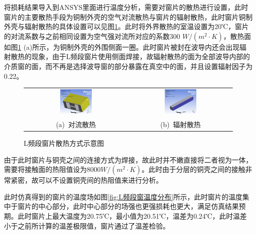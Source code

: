 \documentclass[master]{thesis-uestc}
\begin{document}
将损耗结果导入到ANSYS里面进行温度分析，需要对窗片的散热进行设置，此时窗片的主要散热手段为铜制外壳的空气对流散热与窗片的辐射散热，此时窗片铜制外壳与辐射散热的具体设置可以见图\ref{fig:L频段窗片散热示意}。此时将外界散热的室温设置为20℃，窗片的对流系数与之前相同设置为空气强对流所对应的系数300 \(W/(m^2 \cdot K)\)，散热面如图\ref{fig:L频段窗片散热示意} (a)所示，为铜制外壳的外围侧面一圈。此时窗片被封在波导内还会出现辐射散热的现象，由于L频段窗片使用侧面焊接，故辐射散热的面为全部波导内部的介质窗的面，而不再是选择波导窗的部分暴露在真空中的面，并且设置辐射因子为0.22。
\begin{figure}[!htb]
    \small
    \centering
    \begin{tabular}{@{\ }c@{\ }c}
        \includegraphics[width=0.32\textwidth]{pic/chapter4/L对流散热.png} & 
        \hspace{5pt}
        \includegraphics[width=0.32\textwidth]{pic/chapter4/L辐射散热.png}     \\
        \mbox{\small (a) 对流散热}                                                                               & 
        \mbox{\small (b) 辐射散热}                                                                                  \\
    \end{tabular}
    \caption{L频段窗片散热方式示意图}
    \label{fig:L频段窗片散热示意}
\end{figure}

由于此时窗片与铜壳之间的连接方式为焊接，故此时并不嫩直接将二者视为一体，需要将接触面的热阻值设为8000\(W / (m^2 \cdot K)\)。此时由于分层的铜壳之间的接触非常紧密，故可以不设置铜壳间的热阻值来进行分析。

此时仿真得到的窗片的温度场如图\ref{fig:L频段窗温度分布}所示，此时窗片的温度集中于窗片的中心部分，此时中心部分的场强也更强损耗也更大，满足仿真结果预期。此时窗片上最大温度为20.75℃，最小值为20.51℃，温差为0.24℃，此时温差小于之前所计算的温差极限值，窗片通过了温差检验。
\end{document}
